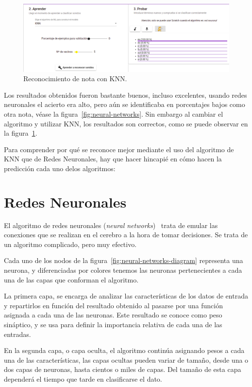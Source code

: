 \documentclass[a4paper, 12pt]{book}
\begin{document}
\begin{figure}
	\centering
	\includegraphics[width=12cm]{img/knn1.png}
	\caption{Reconocimiento de nota con KNN.}\label{fig:knn}
\end{figure}

Los resultados obtenidos fueron bastante buenos, incluso excelentes, usando redes neuronales el acierto era alto, pero aún se identificaba en porcentajes bajos como otra nota, véase la figura~\ref{fig:neural-networks}. Sin embargo al cambiar el algoritmo y utilizar KNN, los resultados son correctos, como se puede observar en la figura~\ref{fig:knn}.

Para comprender por qué se reconoce mejor mediante el uso del algoritmo de KNN que de Redes Neuronales, hay que hacer hincapié en cómo hacen la predicción cada uno delos algoritmos:

\section*{Redes Neuronales}
\label{sec:neural-networks}

El algoritmo de redes neuronales (\textit{neural networks})~\cite{izaurieta2000redes} trata de emular las conexiones que se realizan en el cerebro a la hora de tomar decisiones. Se trata de un algoritmo complicado, pero muy efectivo.

Cada uno de los nodos de la figura~\ref{fig:neural-networks-diagram} representa una neurona, y diferenciadas por colores tenemos las neuronas pertenecientes a cada una de las capas que conforman el algoritmo.

La primera capa, se encarga de analizar las características de los datos de entrada y repartirlos en función del resultado obtenido al pasarse por una función asignada a cada una de las neuronas. Este resultado se conoce como peso sináptico, y se usa para definir la importancia relativa de cada una de las entradas.

En la segunda capa, o capa oculta, el algoritmo continúa asignando pesos a cada una de las características, las capas ocultas pueden variar de tamaño, desde una o dos capas de neuronas, hasta cientos o miles de capas. Del tamaño de esta capa dependerá el tiempo que tarde en clasificarse el dato.
\end{document}
